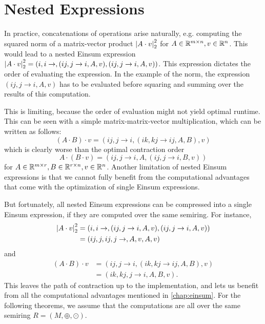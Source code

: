 \chapter{Nested Expressions}
\label{chap:nested}

In practice, concatenations of operations arise naturally, e.g. computing the squared norm of a matrix-vector product $\left\lvert A \cdot v \right\rvert_2^2$
for $A \in \mathbb{R}^{m \times n}, v \in \mathbb{R}^n$.
This would lead to a nested Einsum expression $\left\lvert A \cdot v \right\rvert_2^2 = (i,i \rightarrow , (ij, j \rightarrow i, A, v), (ij, j \rightarrow i, A, v))$.
This expression dictates the order of evaluating the expression.
In the example of the norm, the expression $(ij, j \rightarrow i, A, v)$ has to be evaluated before squaring and summing over the results of this computation.

This is limiting, because the order of evaluation might not yield optimal runtime.
This can be seen with a simple matrix-matrix-vector multiplication, which can be written as follows:
$$(A \cdot B) \cdot v = (ij, j \rightarrow i, (ik, kj \rightarrow ij, A, B), v)$$
which is clearly worse than the optimal contraction order
$$A \cdot (B \cdot v) = (ij, j \rightarrow i, A, (ij, j \rightarrow i, B, v))$$
for $A \in \mathbb{R}^{m \times r}, B \in \mathbb{R}^{r \times n}, v \in \mathbb{R}^n$.
Another limitation of nested Einsum expressions is that we cannot fully benefit from the computational advantages that come with the optimization of single Einsum expressions.

But fortunately, all nested Einsum expressions can be compressed into a single Einsum expression, if they are computed over the same semiring.
For instance,
\begin{align*}
    \left\lvert A \cdot v \right\rvert_2^2 & = (i,i \rightarrow , (ij, j \rightarrow i, A, v), (ij, j \rightarrow i, A, v)) \\
                        & = (ij, j, ij, j \rightarrow, A, v, A, v)
\end{align*}
and
\begin{align*}
    (A \cdot B) \cdot v & = (ij, j \rightarrow i, (ik, kj \rightarrow ij, A, B), v) \\
                        & = (ik, kj, j \rightarrow i, A, B, v).
\end{align*}
This leaves the path of contraction up to the implementation, and lets us benefit from all the computational advantages mentioned in \cref{chap:einsum}.
For the following theorems, we assume that the computations are all over the same semiring $R = (M, \oplus, \odot)$.

